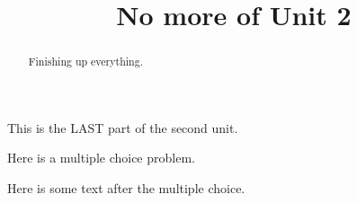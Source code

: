 \PassOptionsToClass{tikzexport}{ximera}\nonstopmode\documentclass{ximera}
\title{No more of Unit 2}
\begin{document}
\begin{abstract}
  Finishing up everything.
\end{abstract}

This is the LAST part of the second unit.

\begin{exercise}
  Here is a multiple choice problem.
  \begin{solution}
    \begin{multiple-choice}
    \end{multiple-choice}
  \end{solution}

  Here is some text after the multiple choice.
\end{exercise}
\end{document}
